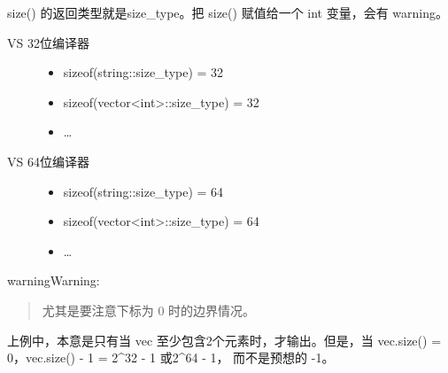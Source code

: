 \documentclass[letterpaper,10pt,english]{sphinxmanual}
\begin{document}
size() 的返回类型就是size\_type。把 size() 赋值给一个 int 变量，会有 warning。
\begin{description}
\item[{VS 32位编译器}] \leavevmode\begin{itemize}
\item {} 
sizeof(string::size\_type) = 32

\item {} 
sizeof(vector\textless{}int\textgreater{}::size\_type) = 32

\item {} 
…

\end{itemize}

\item[{VS 64位编译器}] \leavevmode\begin{itemize}
\item {} 
sizeof(string::size\_type) = 64

\item {} 
sizeof(vector\textless{}int\textgreater{}::size\_type) = 64

\item {} 
…

\end{itemize}

\end{description}

\begin{sphinxadmonition}{warning}{Warning:}\begin{quote}

 尤其是要注意下标为 0 时的边界情况。

%
\begin{sphinxVerbatim}[commandchars=\\\{\},numbers=left,firstnumber=1,stepnumber=1]
  
          
    \PYG{p}{[}\PYG{p}{]}  \PYG{p}{[}\PYG{p}{]}  
\end{sphinxVerbatim}
\end{quote}

上例中，本意是只有当 vec 至少包含2个元素时，才输出。但是，当 vec.size() = 0，vec.size() - 1 = 2\textasciicircum{}32 - 1 或2\textasciicircum{}64 - 1，
而不是预想的 -1。
\end{sphinxadmonition}
\end{document}
